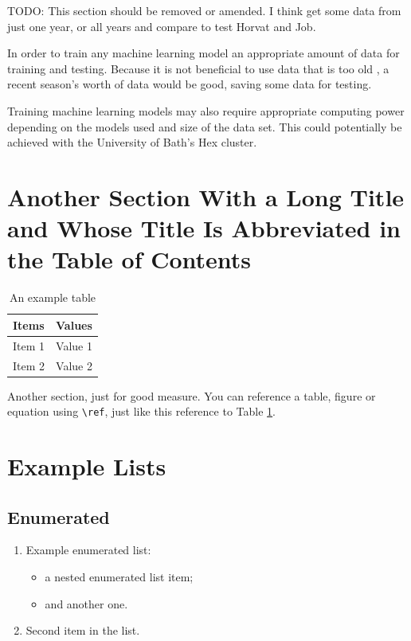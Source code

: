 \documentclass[12pt,a4paper]{report}
\begin{document}
TODO: This section should be removed or amended. I think get some data from just one year, or all years and compare to test Horvat and Job.

In order to train any machine learning model an appropriate amount of data for training and testing. 
Because it is not beneficial to use data that is too old \citep{horvat2020}, a recent season's worth of data would be good, saving some data for testing. 

Training machine learning models may also require appropriate computing power depending on the models used and size of the data set. 
This could potentially be achieved with the University of Bath's Hex cluster.

\section[Short Section Title]{Another Section With a Long Title and Whose Title Is Abbreviated in the Table of Contents}

\begin{table}[htb]
\caption{An example table}
\bigskip
\begin{center}
\label{Example-Table}
\begin{tabular}{|l|l|}
\hline
Items & Values \\
\hline
\hline
Item 1 & Value 1 \\
Item 2 & Value 2 \\
\hline
\end{tabular}
\end{center}
\end{table}

Another section, just for good measure. You can reference a table, figure or equation using \verb|\ref|, just like this reference to Table \ref{Example-Table}.

\section{Example Lists}

\subsection{Enumerated}

\begin{enumerate}
\item Example enumerated list:
  \begin{itemize}
  \item a nested enumerated list item;
  \item and another one.
  \end{itemize}
\item Second item in the list.
\end{enumerate}
\end{document}
